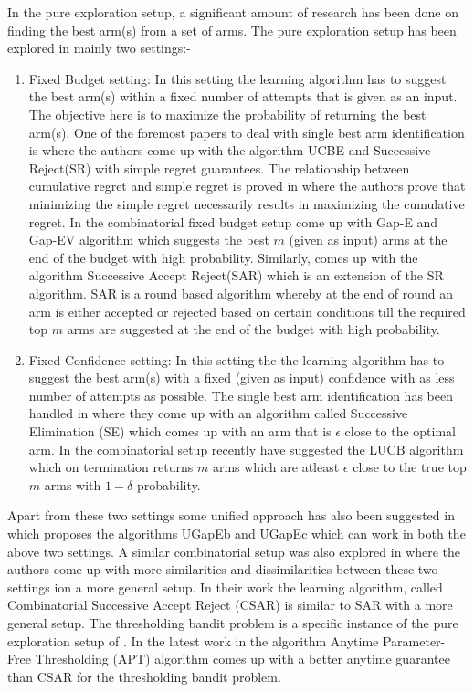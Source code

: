 	In the pure exploration setup, a significant amount of research has been done on finding the best arm(s) from a set of arms. The pure exploration setup has been explored in mainly two settings:-
\begin{enumerate}
\item Fixed Budget setting: In this setting the learning algorithm has to suggest the best arm(s) within a fixed number of attempts that is given as an input. The objective here is to maximize the probability of returning the best arm(s). One of the foremost papers to deal with single best arm identification is \cite{audibert2009exploration} where the authors come up with the algorithm UCBE and Successive Reject(SR) with simple regret guarantees. The relationship between cumulative regret and simple regret is proved in \cite{bubeck2011pure} where the authors prove that minimizing the simple regret necessarily results in maximizing the cumulative regret. In the combinatorial fixed budget setup \cite{gabillon2011multi} come up with Gap-E and Gap-EV algorithm which suggests the best $m$ (given as input) arms at the end of the budget with high probability. Similarly, \cite{bubeck2013multiple} comes up with the algorithm Successive Accept Reject(SAR) which is an extension of the SR algorithm. SAR is a round based algorithm whereby at the end of round an arm is either accepted or rejected based on certain conditions till the required top $m$ arms are suggested at the end of the budget with high probability. 
\item Fixed Confidence setting: In this setting the the learning algorithm has to suggest the best arm(s) with a fixed (given as input) confidence with as less number of attempts as possible. The single best arm identification has been handled in \cite{even2006action} where they come up with an algorithm called Successive Elimination (SE) which comes up with an arm that is $\epsilon$ close to the optimal arm. In the combinatorial setup recently \cite{kalyanakrishnan2012pac} have suggested the LUCB algorithm which on termination returns $m$ arms which are atleast $\epsilon$ close to the true top $m$ arms with $1-\delta$ probability.
\end{enumerate}	

	Apart from these two settings some unified approach has also been suggested in \cite{gabillon2012best} which proposes the algorithms UGapEb and UGapEc which can work in both the above two settings. A similar combinatorial setup was also explored in \cite{chen2014combinatorial} where the authors come up with more similarities and dissimilarities between these two settings ion a more general setup. In their work the learning algorithm, called Combinatorial Successive Accept Reject (CSAR) is similar to SAR with a more general setup. The thresholding bandit problem is a specific instance of the pure exploration setup of \cite{chen2014combinatorial}. In the latest work in \cite{locatelli2016optimal} the algorithm Anytime Parameter-Free Thresholding (APT) algorithm comes up with a better anytime guarantee than CSAR for the thresholding bandit problem.